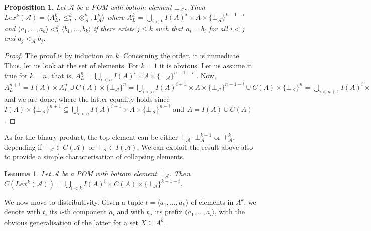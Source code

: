 \documentclass[a4paper]{elsarticle}
\newtheorem{lemma}{Lemma}
\newtheorem{proposition}{Proposition}
\newcommand{\monop}{\otimes}
\newcommand{\1}{\mathbf{1}}
\begin{document}
\begin{proposition}\label{pomLex}
	Let $\mathcal{A}$ be a POM with bottom element $\bot_\mathcal{A}$.
	Then $Lex^{k}(\mathcal{A}) = \langle A^k_L, \leq^k_L, \monop^k_\mathcal{A}, \1^k_\mathcal{A} \rangle$
	where $A^k_L = \bigcup_{i < k}I(A)^i \times A \times \{\bot_\mathcal{A}\}^{k-1-i}$
	and $\langle a_1, \ldots, a_k\rangle <^k_L \langle b_1, \ldots, b_k\rangle$ if there exists $j \leq k$ such that
	$a_i = b_i$ for all $i < j$ and %
	$a_{j} <_\mathcal{A}  b_{j}$.
\end{proposition}
\begin{proof}
	The proof is by induction on $k$. Concerning the order, it is immediate.
	Thus, let us look at the set of elements. For $k = 1$ it is obvious.
	Let us assume it true for $k = n$, that is,
	$A^n_L = \bigcup_{i < n}I(A)^i \times A \times \{\bot_\mathcal{A}\}^{n-1-i}$ .
	Now, 
	$A^{n+1}_L =  I(A) \times A^{n}_L  \cup C(A) \times \{\bot_\mathcal{A}\}^{n} =
	\bigcup_{i < n}I(A)^{i+1} \times A \times \{\bot_\mathcal{A}\}^{n-1-i} \cup C(A) \times \{\bot_\mathcal{A}\}^{n} = %
	\bigcup_{i < n+1}I(A)^{i} \times A \times \{\bot_\mathcal{A}\}^{n-i}$
	and we are done, where the latter equality holds since
	$I(A) \times \{\bot_\mathcal{A}\}^{n+1} \subseteq \bigcup_{i < n}I(A)^{i+1} \times A \times \{\bot_\mathcal{A}\}^{n-i}$
	and $A = I(A) \cup C(A)$.
\end{proof}

As for the binary product, the top element can be 
either $\top_\mathcal{A} \cdot \bot^{k-1}_\mathcal{A}$ or $\top^k_\mathcal{A}$,
depending if $\top_\mathcal{A} \in C(\mathcal{A})$ or $\top_\mathcal{A} \in I(\mathcal{A})$.
%
We can exploit the result above also to provide a simple characterisation of collapsing elements.

\begin{lemma}
	Let $\mathcal{A}$ be a POM with bottom element $\bot_\mathcal{A}$.
	Then $C(Lex^{k}(\mathcal{A})) = \bigcup_{i < k}I(A)^i \times C(A) \times \{\bot_\mathcal{A}\}^{k-1-i}$.
\end{lemma}


We now move to distributivity. 
Given a tuple $t = \langle a_1, \ldots, a_k \rangle$ of elements in $A^k$, we denote with $t_i$ its 
$i$-th component $a_i$ and with $t_{\mid i}$ its prefix $\langle a_1, \ldots, a_i \rangle$,
with the obvious generalisation of the latter for a set $X \subseteq A^k$.
\end{document}
